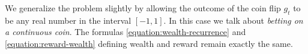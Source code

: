 We generalize the problem slightly by allowing the outcome of the coin flip
$g_t$ to be any real number in the interval $[-1,1]$. In this case we talk about
\emph{betting on a continuous coin}. The formulas
\eqref{equation:wealth-recurrence} and \eqref{equation:reward-wealth} defining
wealth and reward remain exactly the same.
